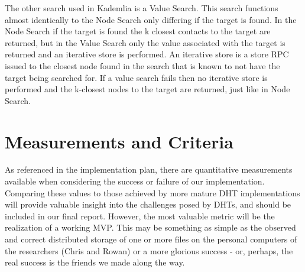 \documentclass[12pt]{report}
\begin{document}
		The other search used in Kademlia is a Value Search. This search 
		functions almost identically to the Node Search only differing if the 
		target is found. In the Node Search if the target is found the k closest 
		contacts to the target are returned, but in the Value Search only the 
		value associated with the target is returned and an iterative store is 
		performed. An iterative store is a store RPC issued to the closest node 
		found in the search that is known to not have the target being searched 
		for. If a value search fails then no iterative store is performed and 
		the k-closest nodes to the target are returned, just like in Node Search.

    \section{Measurements and Criteria}
    As referenced in the implementation plan, there are quantitative
    measurements available when considering the success or failure of our
    implementation.  Comparing these values to those achieved by more mature
    DHT implementations will provide valuable insight into the challenges posed
    by DHTs, and should be included in our final report.  However, the most
    valuable metric will be the realization of a working MVP.  This may be
    something as simple as the observed and correct distributed storage of one
    or more files on the personal computers of the researchers (Chris and
    Rowan) or a more glorious success - or, perhaps, the real success is the
    friends we made along the way.
\end{document}

